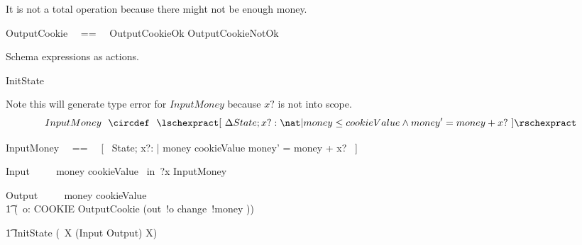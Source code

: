 \documentclass{article}
\begin{document}
It is not a total operation because there might not be enough money.
%
\begin{zed}
   OutputCookie ~~==~~ OutputCookieOk \lor OutputCookieNotOk
\end{zed}

Schema expressions as actions. 
%
\begin{circusaction}
    InitState ~~\circdef~~ \lschexpract [~ State~' | money' = 0 \land quantity' = cookieQuantity ~] \rschexpract 
\end{circusaction}

Note this will generate type error for $InputMoney$ because $x?$ is not into scope.
%
\[
    InputMoney ~~\circdef~~ \lschexpract [~ \Delta State; x?: \nat | money \leq cookieValue \land money' = money + x? ~] \rschexpract
\]
%
\begin{zed}
    InputMoney ~~==~~ [~ \Delta State; x?: \nat | money \leq cookieValue \land money' = money + x? ~] 
\end{zed}

\begin{circusaction}
   Input ~~\circdef~~ \lcircguard money \leq cookieValue \rcircguard  \circguard\ in~?x \then \lschexpract InputMoney \rschexpract
\end{circusaction}

\begin{circusaction}
    Output ~~\circdef~~ \lcircguard money \geq cookieValue \rcircguard \circguard\ \\
        \t1 (\circvar\ o: COOKIE \circspot \lschexpract OutputCookie \rschexpract \circseq (out~!o \then change~!money \then \Skip))
\end{circusaction}
    

\begin{circusaction}
   \t1 \circspot InitState \circseq (\circmu\ X \circspot (Input \extchoice Output) \circseq X) 
\end{circusaction}
   
\begin{circus}
   \circend
\end{circus}
\end{document}
